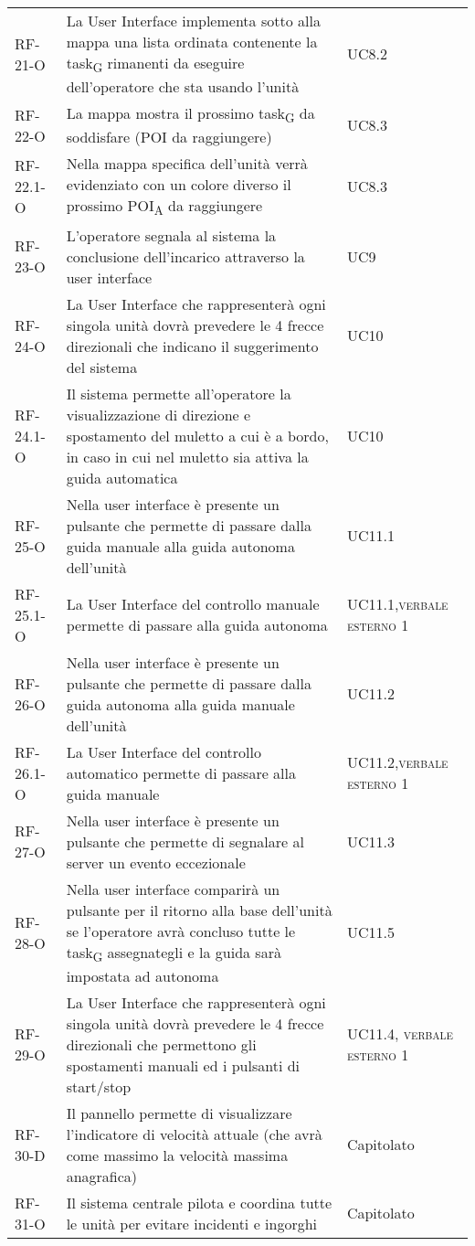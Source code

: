 \begin{longtable}{ 
		>{}p{} 
		>{}p{}
		>{}p{} }
RF-21-O & La User Interface implementa sotto alla mappa una lista ordinata contenente la \gls{task}\textsubscript{G} rimanenti da eseguire dell’operatore che sta usando l’unità & UC8.2\tabularnewline
RF-22-O & La mappa mostra il prossimo \gls{task}\textsubscript{G} da soddisfare (POI da raggiungere) & UC8.3\tabularnewline
RF-22.1-O & Nella mappa specifica dell’unità verrà evidenziato con un colore diverso il prossimo \acrshort{POI}\textsubscript{A} da raggiungere & UC8.3\tabularnewline
RF-23-O & L’operatore segnala al sistema la conclusione dell’incarico attraverso la user interface & UC9\tabularnewline
RF-24-O & La User Interface che rappresenterà ogni singola unità dovrà prevedere le 4 frecce direzionali che indicano il suggerimento del sistema & UC10\tabularnewline
RF-24.1-O & Il sistema permette all’operatore la visualizzazione di direzione e spostamento del muletto a cui è a bordo, in caso in cui nel muletto sia attiva la guida automatica & UC10\tabularnewline
RF-25-O & Nella user interface è presente un pulsante che permette di passare dalla guida manuale alla guida autonoma dell’unità & UC11.1\tabularnewline
RF-25.1-O & La User Interface del controllo manuale permette di passare alla guida autonoma & UC11.1,\newline \textsc{verbale esterno 1}\tabularnewline
RF-26-O & Nella user interface è presente un pulsante che permette di passare dalla guida autonoma alla guida manuale dell’unità & UC11.2\tabularnewline
RF-26.1-O & La User Interface del controllo automatico permette di passare alla guida manuale & UC11.2,\newline \textsc{verbale esterno 1}\tabularnewline
RF-27-O & Nella user interface è presente un pulsante che permette di segnalare al server un evento eccezionale & UC11.3\tabularnewline
RF-28-O & Nella user interface comparirà  un pulsante per il ritorno alla base dell’unità se l'operatore avrà concluso tutte le \gls{task}\textsubscript{G} assegnategli e la guida sarà impostata ad autonoma  & UC11.5\tabularnewline
RF-29-O & La User Interface che rappresenterà ogni singola unità dovrà prevedere le 4 frecce direzionali che permettono gli spostamenti manuali ed i pulsanti di start/stop & UC11.4, \newline \textsc{verbale esterno 1}\tabularnewline
RF-30-D & Il pannello permette di visualizzare l’indicatore di velocità attuale (che avrà come massimo la velocità massima anagrafica) & Capitolato\tabularnewline
RF-31-O & Il sistema centrale pilota e coordina tutte le unità per evitare incidenti e ingorghi & Capitolato\tabularnewline

\end{longtable}

